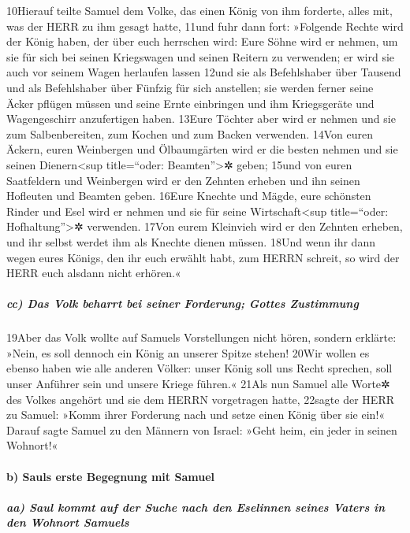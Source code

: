 10Hierauf teilte Samuel dem Volke, das einen König von ihm forderte,
alles mit, was der HERR zu ihm gesagt hatte, 11und fuhr dann fort:
»Folgende Rechte wird der König haben, der über euch herrschen wird:
Eure Söhne wird er nehmen, um sie für sich bei seinen Kriegswagen und
seinen Reitern zu verwenden; er wird sie auch vor seinem Wagen herlaufen
lassen 12und sie als Befehlshaber über Tausend und als Befehlshaber über
Fünfzig für sich anstellen; sie werden ferner seine Äcker pflügen müssen
und seine Ernte einbringen und ihm Kriegsgeräte und Wagengeschirr
anzufertigen haben. 13Eure Töchter aber wird er nehmen und sie zum
Salbenbereiten, zum Kochen und zum Backen verwenden. 14Von euren Äckern,
euren Weinbergen und Ölbaumgärten wird er die besten nehmen und sie
seinen Dienern\textless sup title=``oder: Beamten''\textgreater✲ geben;
15und von euren Saatfeldern und Weinbergen wird er den Zehnten erheben
und ihn seinen Hofleuten und Beamten geben. 16Eure Knechte und Mägde,
eure schönsten Rinder und Esel wird er nehmen und sie für seine
Wirtschaft\textless sup title=``oder: Hofhaltung''\textgreater✲
verwenden. 17Von eurem Kleinvieh wird er den Zehnten erheben, und ihr
selbst werdet ihm als Knechte dienen müssen. 18Und wenn ihr dann wegen
eures Königs, den ihr euch erwählt habt, zum HERRN schreit, so wird der
HERR euch alsdann nicht erhören.«

\hypertarget{cc-das-volk-beharrt-bei-seiner-forderung-gottes-zustimmung}{%
\subparagraph{cc) Das Volk beharrt bei seiner Forderung; Gottes
Zustimmung}\label{cc-das-volk-beharrt-bei-seiner-forderung-gottes-zustimmung}}

19Aber das Volk wollte auf Samuels Vorstellungen nicht hören, sondern
erklärte: »Nein, es soll dennoch ein König an unserer Spitze stehen!
20Wir wollen es ebenso haben wie alle anderen Völker: unser König soll
uns Recht sprechen, soll unser Anführer sein und unsere Kriege führen.«
21Als nun Samuel alle Worte✲ des Volkes angehört und sie dem HERRN
vorgetragen hatte, 22sagte der HERR zu Samuel: »Komm ihrer Forderung
nach und setze einen König über sie ein!« Darauf sagte Samuel zu den
Männern von Israel: »Geht heim, ein jeder in seinen Wohnort!«

\hypertarget{b-sauls-erste-begegnung-mit-samuel}{%
\paragraph{b) Sauls erste Begegnung mit
Samuel}\label{b-sauls-erste-begegnung-mit-samuel}}

\hypertarget{aa-saul-kommt-auf-der-suche-nach-den-eselinnen-seines-vaters-in-den-wohnort-samuels}{%
\subparagraph{aa) Saul kommt auf der Suche nach den Eselinnen seines
Vaters in den Wohnort
Samuels}\label{aa-saul-kommt-auf-der-suche-nach-den-eselinnen-seines-vaters-in-den-wohnort-samuels}}

